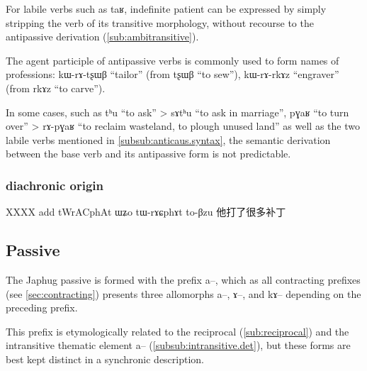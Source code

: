 \documentclass[oldfontcommands,oneside,a4paper,11pt]{memoir}
\newcommand{\ipa}[1]{{\phon #1}} %
\begin{document}
For labile verbs such as \ipa{taʁ}, indefinite patient can be expressed by simply stripping the verb of its transitive morphology, without recourse to the antipassive derivation (\ref{sub:ambitransitive}).

The agent participle of antipassive verbs is commonly used to form names of professions: \ipa{kɯ-rɤ-tʂɯβ} ``tailor'' (from \ipa{tʂɯβ} ``to sew''), \ipa{kɯ-rɤ-rkɤz} ``engraver'' (from \ipa{rkɤz} ``to carve'').

In some cases, such as \ipa{tʰu} ``to ask'' > \ipa{sɤtʰu} ``to ask in marriage'', \ipa{pɣaʁ} ``to turn over'' > \ipa{rɤ-pɣaʁ} ``to reclaim wasteland, to plough unused land'' as well as the two labile verbs mentioned in \ref{subsub:anticaus.syntax}, the semantic derivation between the base verb and its antipassive form is not predictable.

\subsubsection{diachronic origin} \label{subsub:antipass.dia}
  
XXXX add tWrACphAt ɯʑo tɯ-rɤɕphɤt to-βzu 他打了很多补丁 
\subsection{Passive} \label{sub:passive}
The Japhug passive is formed with the prefix \ipa{a}--, which as all contracting prefixes (see \ref{sec:contracting}) presents three allomorphs  \ipa{a}--,  \ipa{ɤ}--, and  \ipa{kɤ}-- depending on the preceding prefix. 

This prefix is etymologically related to the reciprocal (\ref{sub:reciprocal}) and the intransitive thematic element \ipa{a}-- (\ref{subsub:intransitive.det}), but these forms are best kept distinct in a synchronic description.
\end{document}
